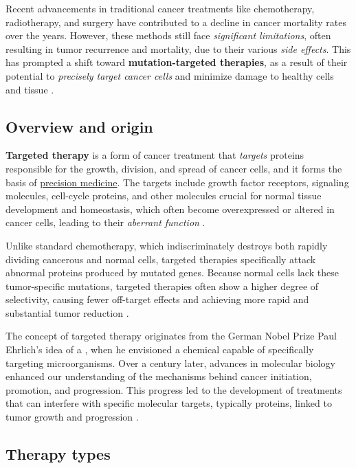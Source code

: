 Recent advancements in traditional cancer treatments like chemotherapy, radiotherapy, and surgery have contributed to a decline in cancer mortality rates over the years. However, these methods still face \textit{significant limitations}, often resulting in tumor recurrence and mortality, due to their various \textit{side effects}. This has prompted a shift toward \textbf{mutation-targeted therapies}, as a result of their potential to \textit{precisely target cancer cells} and minimize damage to healthy cells and tissue \cite{target_therapy1, jci}.

\subsection{Overview and origin}

\textbf{Targeted therapy} is a form of cancer treatment that \textit{targets} proteins responsible for the growth, division, and spread of cancer cells, and it forms the basis of \href{https://en.wikipedia.org/wiki/Personalized_medicine}{precision medicine}. The targets include growth factor receptors, signaling molecules, cell-cycle proteins, and other molecules crucial for normal tissue development and homeostasis, which often become overexpressed or altered in cancer cells, leading to their \textit{aberrant function} \cite{se_tt}.

Unlike standard chemotherapy, which indiscriminately destroys both rapidly dividing cancerous and normal cells, targeted therapies specifically attack abnormal proteins produced by mutated genes. Because normal cells lack these tumor-specific mutations, targeted therapies often show a higher degree of selectivity, causing fewer off-target effects and achieving more rapid and substantial tumor reduction \cite{jci}.

The concept of targeted therapy originates from the German Nobel Prize Paul Ehrlich's idea of a  \cite{ehrlich}, when he envisioned a chemical capable of specifically targeting microorganisms. Over a century later, advances in molecular biology enhanced our understanding of the mechanisms behind cancer initiation, promotion, and progression. This progress led to the development of treatments that can interfere with specific molecular targets, typically proteins, linked to tumor growth and progression \cite{se_tt}.

\subsection{Therapy types}

